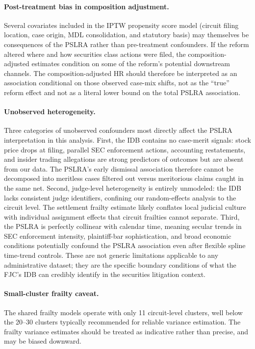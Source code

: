 \paragraph{Post-treatment bias in composition adjustment.}
Several covariates included in the IPTW propensity score
model (circuit filing location, case origin, MDL
consolidation, and statutory basis) may themselves be
consequences of the PSLRA rather than pre-treatment
confounders. If the reform altered where and how securities
class actions were filed, the composition-adjusted estimates
condition on some of the reform's potential downstream
channels. The composition-adjusted HR should therefore be
interpreted as an association conditional on those observed
case-mix shifts, not as the
``true'' reform effect and not as a literal lower bound on
the total PSLRA association.

\paragraph{Unobserved heterogeneity.}
Three categories of unobserved confounders most directly affect the PSLRA interpretation in this analysis. First, the IDB contains no case-merit signals: stock price drops at filing, parallel SEC enforcement actions, accounting restatements, and insider trading allegations are strong predictors of outcomes \citep{cox2008, johnson2007, choi2007} but are absent from our data. The PSLRA's early dismissal association therefore cannot be decomposed into meritless cases filtered out versus meritorious claims caught in the same net. Second, judge-level heterogeneity is entirely unmodeled: the IDB lacks consistent judge identifiers, confining our random-effects analysis to the circuit level. The settlement frailty estimate likely conflates local judicial culture with individual assignment effects that circuit frailties cannot separate. Third, the PSLRA is perfectly collinear with calendar time, meaning secular trends in SEC enforcement intensity, plaintiff-bar sophistication, and broad economic conditions potentially confound the PSLRA association even after flexible spline time-trend controls. These are not generic limitations applicable to any administrative dataset; they are the specific boundary conditions of what the FJC's IDB can credibly identify in the securities litigation context.

\paragraph{Small-cluster frailty caveat.}
The shared frailty models operate with only 11 circuit-level
clusters, well below the 20--30 clusters typically
recommended for reliable variance estimation. The frailty
variance estimates should be treated as indicative rather than
precise, and may be biased downward.

